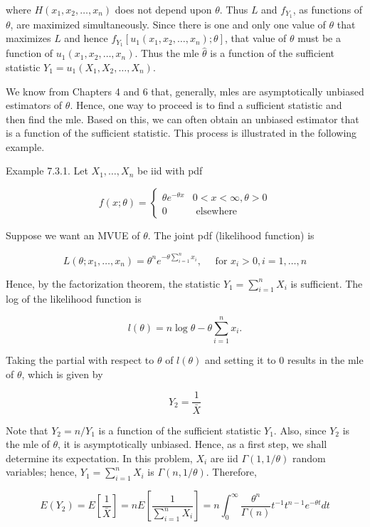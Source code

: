 where $H\left(x_{1}, x_{2}, \ldots, x_{n}\right)$ does not depend upon $\theta$. Thus $L$ and $f_{Y_{1}}$, as functions of $\theta$, are maximized simultaneously. Since there is one and only one value of $\theta$ that maximizes $L$ and hence $f_{Y_{1}}\left[u_{1}\left(x_{1}, x_{2}, \ldots, x_{n}\right) ; \theta\right]$, that value of $\theta$ must be a function of $u_{1}\left(x_{1}, x_{2}, \ldots, x_{n}\right)$. Thus the mle $\hat{\theta}$ is a function of the sufficient statistic $Y_{1}=u_{1}\left(X_{1}, X_{2}, \ldots, X_{n}\right)$.

We know from Chapters 4 and 6 that, generally, mles are asymptotically unbiased estimators of $\theta$. Hence, one way to proceed is to find a sufficient statistic and then find the mle. Based on this, we can often obtain an unbiased estimator that is a function of the sufficient statistic. This process is illustrated in the following example.

Example 7.3.1. Let $X_{1}, \ldots, X_{n}$ be iid with pdf

$$
f(x ; \theta)= \begin{cases}\theta e^{-\theta x} & 0<x<\infty, \theta>0 \\ 0 & \text { elsewhere }\end{cases}
$$

Suppose we want an MVUE of $\theta$. The joint pdf (likelihood function) is

$$
L\left(\theta ; x_{1}, \ldots, x_{n}\right)=\theta^{n} e^{-\theta \sum_{i=1}^{n} x_{i}}, \quad \text { for } x_{i}>0, i=1, \ldots, n
$$

Hence, by the factorization theorem, the statistic $Y_{1}=\sum_{i=1}^{n} X_{i}$ is sufficient. The log of the likelihood function is

$$
l(\theta)=n \log \theta-\theta \sum_{i=1}^{n} x_{i} .
$$

Taking the partial with respect to $\theta$ of $l(\theta)$ and setting it to 0 results in the mle of $\theta$, which is given by

$$
Y_{2}=\frac{1}{\bar{X}}
$$

Note that $Y_{2}=n / Y_{1}$ is a function of the sufficient statistic $Y_{1}$. Also, since $Y_{2}$ is the mle of $\theta$, it is asymptotically unbiased. Hence, as a first step, we shall determine its expectation. In this problem, $X_{i}$ are iid $\Gamma(1,1 / \theta)$ random variables; hence, $Y_{1}=\sum_{i=1}^{n} X_{i}$ is $\Gamma(n, 1 / \theta)$. Therefore,

$$
E\left(Y_{2}\right)=E\left[\frac{1}{\bar{X}}\right]=n E\left[\frac{1}{\sum_{i=1}^{n} X_{i}}\right]=n \int_{0}^{\infty} \frac{\theta^{n}}{\Gamma(n)} t^{-1} t^{n-1} e^{-\theta t} d t
$$

